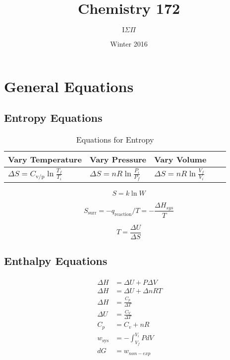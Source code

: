 \documentclass{article}
\title{Chemistry 172}
\author{$\text{I} \Sigma \Pi$}
\date{Winter 2016}
\begin{document}
\maketitle

\section{General Equations}


\subsection{Entropy Equations}

\begin{table}[h]
\centering
\caption{Equations for Entropy}
\label{my-label}
\def\arraystretch{1.5}
\begin{tabular}{|l|l|l|l|l|}
\hline
Vary Temperature & Vary Pressure & Vary Volume   \\
\hline
$\Delta S = C_\text{v/p}\ln{\frac{T_f}{T_i}}$   & $\Delta S = nR\ln{\frac{P_i}{P_f}}$ & $\Delta S = nR\ln{\frac{V_f}{V_i}}$ \\
\hline
\end{tabular}
\end{table}

\begin{equation*}
S = k\ln{W}
\end{equation*}

\begin{equation*}
S_{\text{surr}} = - q_{\text{reaction}}/T = - \frac{\Delta H_{sys}}{T}
\end{equation*}

\[
T = \frac{\Delta U}{\Delta S}
\]



\subsection{Enthalpy Equations}
\begin{align*}
\begin{split}
\
\Delta H &= \Delta U + P \Delta V \\ 
\
\Delta H &= \Delta U + \Delta n RT\\
\
\Delta H &= \frac{C_p}{\Delta T}\\
\
\Delta U &= \frac{C_V}{\Delta T}\\
\
C_p &= C_v + nR\\
\
w_\text{sys} & = - \int_{V_f}^{V_i} P dV\\
\
dG & = w_{non-exp}\\
\end{split}
\end{align*}
\end{document}
